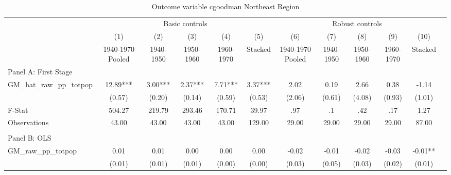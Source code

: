  \begin{table}[htbp]\centering {} \begin{threeparttable} \caption{Outcome variable cgoodman Northeast Region} \begin{tabular}{l*{11}{c}} \toprule
          &\multicolumn{5}{c}{Basic controls}                                   &\multicolumn{5}{c}{Robust controls}                                  \\\cmidrule(lr){2-6}\cmidrule(lr){7-11}
          &\multicolumn{1}{c}{(1)}&\multicolumn{1}{c}{(2)}&\multicolumn{1}{c}{(3)}&\multicolumn{1}{c}{(4)}&\multicolumn{1}{c}{(5)}&\multicolumn{1}{c}{(6)}&\multicolumn{1}{c}{(7)}&\multicolumn{1}{c}{(8)}&\multicolumn{1}{c}{(9)}&\multicolumn{1}{c}{(10)}\\
          &\multicolumn{1}{c}{1940-1970 Pooled}&\multicolumn{1}{c}{1940-1950}&\multicolumn{1}{c}{1950-1960}&\multicolumn{1}{c}{1960-1970}&\multicolumn{1}{c}{Stacked}&\multicolumn{1}{c}{1940-1970 Pooled}&\multicolumn{1}{c}{1940-1950}&\multicolumn{1}{c}{1950-1960}&\multicolumn{1}{c}{1960-1970}&\multicolumn{1}{c}{Stacked}\\
\cmidrule(lr){1-11}
\multicolumn{10}{l}{Panel A: First Stage}\\
\cmidrule(lr){1-11}
GM\_hat\_raw\_pp\_totpop&     12.89***&      3.00***&      2.37***&      7.71***&      3.37***&      2.02   &      0.19   &      2.66   &      0.38   &     -1.14   \\
          &    (0.57)   &    (0.20)   &    (0.14)   &    (0.59)   &    (0.53)   &    (2.06)   &    (0.61)   &    (4.08)   &    (0.93)   &    (1.01)   \\
\midrule
F-Stat    &    504.27   &    219.79   &    293.46   &    170.71   &     39.97   &       .97   &        .1   &       .42   &       .17   &      1.27   \\
Observations&     43.00   &     43.00   &     43.00   &     43.00   &    129.00   &     29.00   &     29.00   &     29.00   &     29.00   &     87.00   \\
\cmidrule[\heavyrulewidth](lr){1-11} \\ \cmidrule[\heavyrulewidth](lr){1-11}
\multicolumn{10}{l}{Panel B: OLS}\\
\cmidrule(lr){1-11}
GM\_raw\_pp\_totpop&      0.01   &      0.01   &      0.00   &      0.00   &      0.00   &     -0.02   &     -0.01   &     -0.02   &     -0.03   &     -0.01** \\
          &    (0.01)   &    (0.01)   &    (0.01)   &    (0.00)   &    (0.00)   &    (0.03)   &    (0.05)   &    (0.03)   &    (0.02)   &    (0.01)   \\

\end{tabular}
\end{threeparttable}
\end{table}
